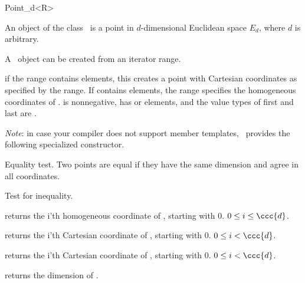 \begin{ccRefClass}{Point_d<R>}

\ccDefinition

An object of the class \ccClassTemplateName\ is a point in $d$-dimensional
Euclidean space $E_d$, where $d$ is arbitrary. 


\ccCreation
{}

A \ccClassTemplateName\ object can be created from an iterator range. 

	{if the range \ccc{[first,last)} contains  elements,
	 this creates a point with Cartesian coordinates as specified by 
	 the range. If \ccc{[first,last)} contains  elements,
	 the range specifies the homogeneous coordinates of \ccVar. 
	 \ccPrecond {} is nonnegative, \ccc{[first,last)} has 
	  or  elements, and the value types of first
	 and last are .}

\emph{Note}: in case your compiler does not support member templates, \cgal\
provides the following specialized constructor.


\ccOperations

	{Equality test. Two points are equal if they have the same
	 dimension and agree in all coordinates.}

	{Test for inequality.}

	{returns the i'th homogeneous coordinate of \ccVar, starting
	 with 0. \ccPrecond $0\leq i\leq \ccc{d}$.}

	{returns the i'th Cartesian coordinate of \ccVar, starting
	 with 0. \ccPrecond $0\leq i < \ccc{d}$.}

	{returns the i'th Cartesian coordinate of \ccVar, starting
	with 0. \ccPrecond $0\leq i < $.}

	{returns the dimension \ccc{d} of \ccVar.}

\end{ccRefClass}%
